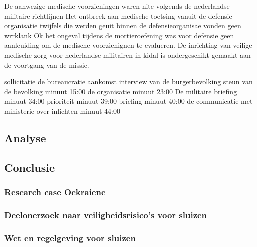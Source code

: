De aanwezige medische voorzieningen waren nite volgends de nederlandse militaire richtlijnen
Het ontbreek aan medische toetsing vanuit de defensie organisatie
twijfels die werden geuit binnen de defensieorganisae vonden geen wrrklank
Ok het ongeval tijdens de mortieroefening was voor defensie geen aanleuiding om de medische voorzienignen te evalueren.
De inrichting van veilige medische zorg voor nederlandse militairen in kidal is ondergeschikt gemaakt aan de voortgang van de missie.


\cite{ovvMortierOngevalMaliVideo} 


\cite{bnnvara13062018malirapport}
\cite{eucal11012021malimissieverlengd}
\cite{nos21052014zorgenmalimissie}
\cite{meijnders}
\cite{bnrwebredactie}
\cite{keultjes01062016malimissiecoalitie}
\cite{veenhof18012019}

\cite{isitman06012016militair}
\cite{nporadio11072016filmdemissie}
\cite{parlementairmonitor15122013mortierongeluk}

sollicitatie
de bureaucratie
aankomst
interview van de burgerbevolking
steun van de bevolking minuut 15:00
de organisatie minuut 23:00
De militaire briefing minuut 34:00
prioriteit minuut 39:00
briefing minuut 40:00
de communicatie met ministerie over inlichten minuut 44:00

\cite{DemissieFilm}





\subsection{Analyse}


\subsection{Conclusie}


\newpage
{}



\subsubsection{Research case Oekraiene}
\subsubsection{Deelonerzoek naar veiligheidsrisico's voor sluizen}
\subsubsection{Wet en regelgeving voor sluizen}


